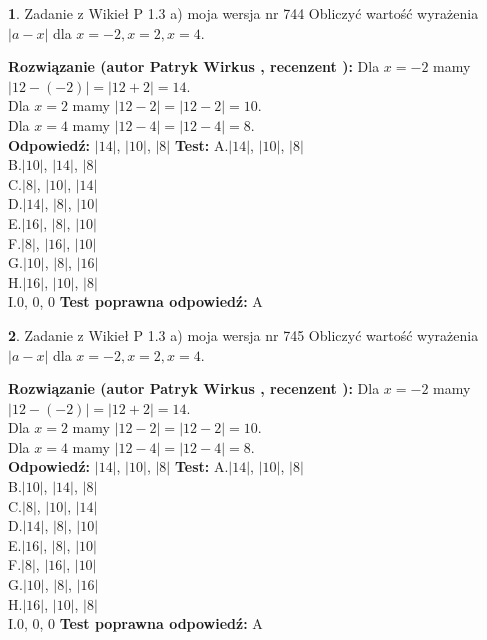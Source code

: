 \documentclass[12pt, a4paper]{article}
\theoremstyle{definition} %
\newtheorem{zad}{}
\newcommand{\zadStart}[1]{\begin{zad}#1\newline}
\newcommand{\zadStop}{\end{zad}}
\newcommand{\rozwStart}[2]{\noindent \textbf{Rozwiązanie (autor #1 , recenzent #2): }\newline}
\newcommand{\rozwStop}{\newline}
\newcommand{\odpStart}{\noindent \textbf{Odpowiedź:}\newline}
\newcommand{\odpStop}{\newline}
\newcommand{\testStart}{\noindent \textbf{Test:}\newline}
\newcommand{\testStop}{\newline}
\newcommand{\kluczStart}{\noindent \textbf{Test poprawna odpowiedź:}\newline}
\newcommand{\kluczStop}{\newline}
\begin{document}
\zadStart{Zadanie z Wikieł P 1.3 a) moja wersja nr 744}
Obliczyć wartość wyrażenia $|a - x|$ dla $x=-2,x=2,x=4$.
\zadStop
\rozwStart{Patryk Wirkus}{}
Dla $x = -2$ mamy $|12 - (-2)| = |12 + 2| = 14$.\\
Dla $x = 2$ mamy $|12 - 2| = |12 - 2| = 10$.\\
Dla $x = 4$ mamy $|12 - 4| = |12 - 4| = 8$.\\
\rozwStop
\odpStart
$|14|$, $|10|$, $|8|$
\odpStop
\testStart
A.$|14|$, $|10|$, $|8|$\\
B.$|10|$, $|14|$, $|8|$\\
C.$|8|$, $|10|$, $|14|$\\
D.$|14|$, $|8|$, $|10|$\\
E.$|16|$, $|8|$, $|10|$\\
F.$|8|$, $|16|$, $|10|$\\
G.$|10|$, $|8|$, $|16|$\\
H.$|16|$, $|10|$, $|8|$\\
I.$0$, $0$, $0$
\testStop
\kluczStart
A
\kluczStop



\zadStart{Zadanie z Wikieł P 1.3 a) moja wersja nr 745}
Obliczyć wartość wyrażenia $|a - x|$ dla $x=-2,x=2,x=4$.
\zadStop
\rozwStart{Patryk Wirkus}{}
Dla $x = -2$ mamy $|12 - (-2)| = |12 + 2| = 14$.\\
Dla $x = 2$ mamy $|12 - 2| = |12 - 2| = 10$.\\
Dla $x = 4$ mamy $|12 - 4| = |12 - 4| = 8$.\\
\rozwStop
\odpStart
$|14|$, $|10|$, $|8|$
\odpStop
\testStart
A.$|14|$, $|10|$, $|8|$\\
B.$|10|$, $|14|$, $|8|$\\
C.$|8|$, $|10|$, $|14|$\\
D.$|14|$, $|8|$, $|10|$\\
E.$|16|$, $|8|$, $|10|$\\
F.$|8|$, $|16|$, $|10|$\\
G.$|10|$, $|8|$, $|16|$\\
H.$|16|$, $|10|$, $|8|$\\
I.$0$, $0$, $0$
\testStop
\kluczStart
A
\kluczStop
\end{document}
